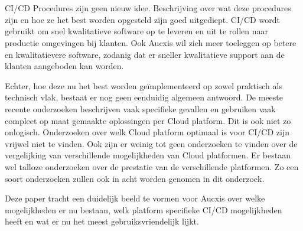 

\section{}
\label{sec:probleemstelling}
CI/CD Procedures zijn geen nieuw idee. Beschrijving over wat deze procedures zijn en hoe ze het best worden opgesteld zijn goed uitgediept. CI/CD wordt gebruikt om snel kwalitatieve software op te leveren en uit te rollen naar productie omgevingen bij klanten. Ook Aucxis wil zich meer toeleggen op betere en kwalitatievere software, zodanig dat er sneller kwalitatieve support aan de klanten aangeboden kan worden. 

Echter, hoe deze nu het best worden geïmplementeerd op zowel praktisch als technisch vlak, bestaat er nog geen eenduidig algemeen antwoord. De meeste recente onderzoeken beschrijven vaak specifieke gevallen en gebruiken vaak compleet op maat gemaakte oplossingen per Cloud platform. Dit is ook niet zo onlogisch. Onderzoeken over welk Cloud platform optimaal is voor CI/CD zijn vrijwel niet te vinden. Ook zijn er weinig tot geen onderzoeken te vinden over de vergelijking van verschillende mogelijkheden van Cloud platformen. Er bestaan wel talloze onderzoeken over de prestatie van de verschillende platformen. Zo een soort onderzoeken zullen ook in acht worden genomen in dit onderzoek.

Deze paper tracht een duidelijk beeld te vormen voor Aucxis over welke mogelijkheden er nu bestaan, welk platform specifieke CI/CD mogelijkheden heeft en wat er nu het meest gebruiksvriendelijk lijkt.

